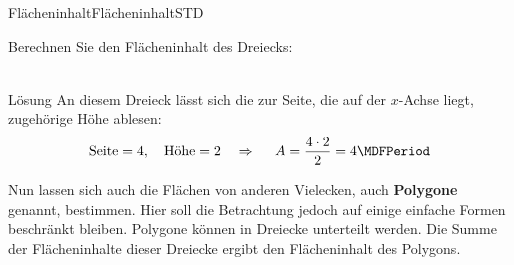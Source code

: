 \begin{MXContent}{Fl\"acheninhalt}{Fl\"acheninhalt}{STD}
\begin{MExercise}
Berechnen Sie den Fl\"acheninhalt des Dreiecks:\\
\ \\
\begin{MHint}{L\"osung}
An diesem Dreieck l\"asst sich die zur Seite, die auf der $x$-Achse liegt, zugeh\"orige H\"ohe ablesen:
\[\text{Seite}=4, \quad \text{H\"ohe}=2\quad
\Rightarrow\quad\ A=\frac{4\cdot 2}{2}=4 \MDFPeriod\] 
\end{MHint}
\end{MExercise}

Nun lassen sich auch die Fl\"achen von anderen Vielecken, auch \textbf{Polygone} genannt, bestimmen. Hier soll die Betrachtung jedoch auf einige einfache Formen beschr\"ankt bleiben. Polygone k\"onnen in Dreiecke unterteilt werden. Die Summe der Fl\"acheninhalte dieser Dreiecke ergibt den Fl\"acheninhalt des Polygons.


\end{MXContent}
